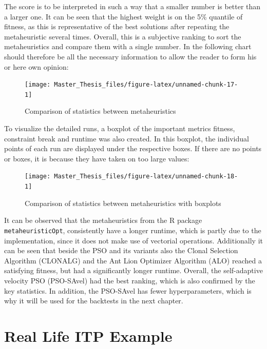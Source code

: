 \documentclass[
  oneside, a4paper, 12pt, openany]{book}
\theoremstyle{definition}
\theoremstyle{definition}
\theoremstyle{definition}
\theoremstyle{definition}
\theoremstyle{remark}
\begin{document}
The score is to be interpreted in such a way that a smaller number is better than a larger one. It can be seen that the highest weight is on the 5\% quantile of fitness, as this is representative of the best solutions after repeating the metaheuristic several times. Overall, this is a subjective ranking to sort the metaheuristics and compare them with a single number. In the following chart should therefore be all the necessary information to allow the reader to form his or here own opinion:

\begin{figure}[H]
\texttt{[image: Master\_Thesis\_files/figure-latex/unnamed-chunk-17-1]} \caption{Comparison of statistics between metaheuristics}\label{fig:unnamed-chunk-17}
\end{figure}

To visualize the detailed runs, a boxplot of the important metrics fitness, constraint break and runtime was also created. In this boxplot, the individual points of each run are displayed under the respective boxes. If there are no points or boxes, it is because they have taken on too large values:

\begin{figure}[H]
\texttt{[image: Master\_Thesis\_files/figure-latex/unnamed-chunk-18-1]} \caption{Comparison of statistics between metaheuristics with boxplots}\label{fig:unnamed-chunk-18}
\end{figure}

It can be observed that the metaheuristics from the R package \texttt{metaheuristicOpt}, consistently have a longer runtime, which is partly due to the implementation, since it does not make use of vectorial operations. Additionally it can be seen that beside the PSO and its variants also the Clonal Selection Algorithm (CLONALG) and the Ant Lion Optimizer Algorithm (ALO) reached a satisfying fitness, but had a significantly longer runtime. Overall, the self-adaptive velocity PSO (PSO-SAvel) had the best ranking, which is also confirmed by the key statistics. In addition, the PSO-SAvel has fewer hyperparameters, which is why it will be used for the backtests in the next chapter.

\hypertarget{reallife}{%
\chapter{Real Life ITP Example}\label{reallife}}
\end{document}
